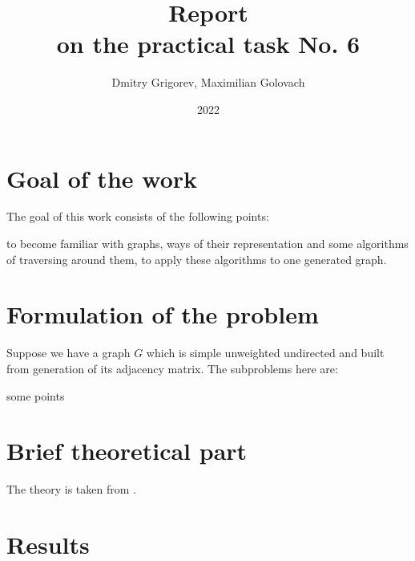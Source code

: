 \documentclass[12pt, bachelor, substylefile = algo_title.rtx]{disser}
\theoremstyle{definition}
\begin{document}
\title{Report\\
on the practical task No. 6}


\author{Dmitry Grigorev, Maximilian Golovach}
\sastatus {}

\date{2022}

\maketitle
\section{Goal of the work}
The goal of this work consists of the following points:
\begin{outline}
\1 to become familiar with graphs, ways of their representation and some algorithms of traversing around them,
\1 to apply these algorithms to one generated graph.
\end{outline}

\section{Formulation of the problem}
Suppose we have a graph $G$ which is simple unweighted undirected and built from generation of its adjacency matrix. The subproblems here are:
\begin{outline}[enumerate]
\1 some points
\end{outline}

\section{Brief theoretical part}
The theory is taken from \cite{erciyes18}.


\section{Results}

\end{document}
